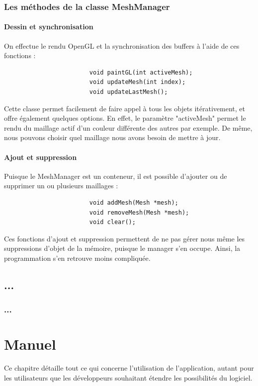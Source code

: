 \documentclass[a4paper]{memoir}
\begin{document}
			\subsection{Les méthodes de la classe MeshManager}
				\label{manager-dev}
				\subsubsection{Dessin et synchronisation}
					On effectue le rendu OpenGL et la synchronisation des buffers à l'aide de ces fonctions :
					\begin{verbatim}
						void paintGL(int activeMesh);
						void updateMesh(int index);
						void updateLastMesh();
					\end{verbatim}
					Cette classe permet facilement de faire appel à tous les objets itérativement, et offre également quelques options. En effet, le 
					paramètre "activeMesh" permet le rendu du maillage actif d'un couleur différente des autres par exemple. De même, nous pouvons choisir 
					quel maillage nous avons besoin de mettre à jour.
					
				\subsubsection{Ajout et suppression}
					Puisque le MeshManager est un conteneur, il est possible d'ajouter ou de supprimer un ou plusieurs maillages :
					\begin{verbatim}
						void addMesh(Mesh *mesh);
						void removeMesh(Mesh *mesh);
						void clear();
					\end{verbatim}
					Ces fonctions d'ajout et suppression permettent de ne pas gérer nous même les suppressions d'objet de la mémoire, puisque le manager 
					s'en occupe. Ainsi, la programmation s'en retrouve moins compliquée.
		
		\section{...}
			\subsection{...}

	\chapter{Manuel}
		Ce chapitre détaille tout ce qui concerne l'utilisation de l'application, autant pour les utilisateurs que les développeurs souhaitant étendre les 
		possibilités du logiciel.
		
\end{document}
